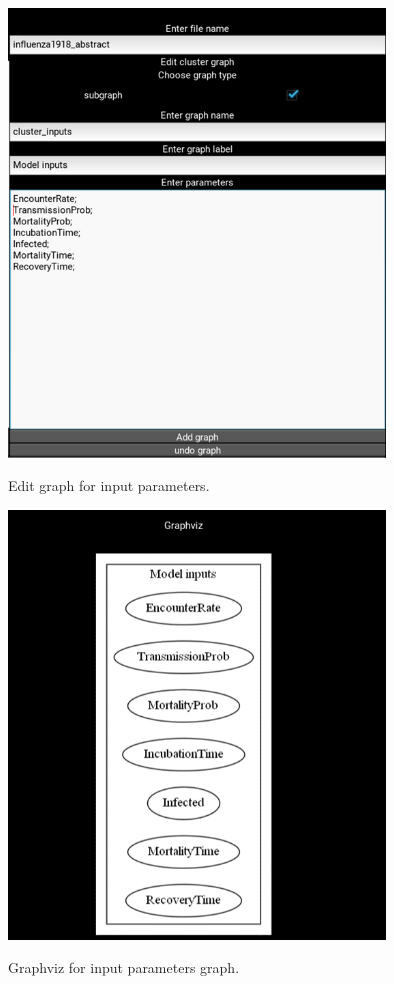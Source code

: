 \begin{figure}[H]
	\centering
	\includegraphics[width=10cm]{figures/influenzaTestProcess3.png}\\
	\caption{Edit graph for input parameters.}
	\label{fig:figure21}
\end{figure}
\begin{figure}[H]
	\centering
	\includegraphics[width=10cm]{figures/influenzaTestProcess4.png}\\
	\caption{Graphviz for input parameters graph.}
	\label{fig:figure22}
\end{figure}
